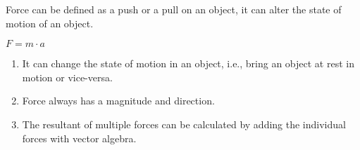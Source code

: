 \documentclass[12pt]{ipu-mechanics}
\begin{document}

    Force can be defined as a push or a pull on an object, it can alter the state of motion of an object.
    \begin{center}
        $F = m\cdot{a}$
    \end{center}

    \begin{enumerate}
        \item It can change the state of motion in an object, i.e., bring an object at rest in motion or vice-versa.
        \item Force always has a magnitude and direction.
        \item The resultant of multiple forces can be calculated by adding the individual forces with vector algebra.
    \end{enumerate}
\end{document}
